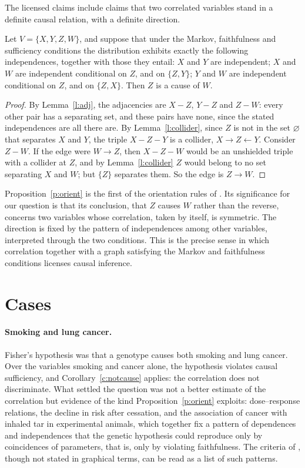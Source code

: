 \documentclass{situationist-preprint}
\begin{document}
The licensed claims include claims that two correlated variables stand in a definite causal relation, with a definite direction.

\begin{proposition}[Orientation]\label{p:orient}
Let $V = \{X, Y, Z, W\}$, and suppose that under the Markov, faithfulness and sufficiency conditions the distribution exhibits exactly the following independences, together with those they entail: $X$ and $Y$ are independent; $X$ and $W$ are independent conditional on $Z$, and on $\{Z, Y\}$; $Y$ and $W$ are independent conditional on $Z$, and on $\{Z, X\}$. Then $Z$ is a cause of $W$.
\end{proposition}

\begin{proof}
By Lemma~\ref{l:adj}, the adjacencies are $X - Z$, $Y - Z$ and $Z - W$: every other pair has a separating set, and these pairs have none, since the stated independences are all there are. By Lemma~\ref{l:collider}, since $Z$ is not in the set $\varnothing$ that separates $X$ and $Y$, the triple $X - Z - Y$ is a collider, $X \to Z \leftarrow Y$. Consider $Z - W$. If the edge were $W \to Z$, then $X - Z - W$ would be an unshielded triple with a collider at $Z$, and by Lemma~\ref{l:collider} $Z$ would belong to no set separating $X$ and $W$; but $\{Z\}$ separates them. So the edge is $Z \to W$.
\end{proof}

Proposition~\ref{p:orient} is the first of the orientation rules of \citet{Meek1995b}. Its significance for our question is that its conclusion, that $Z$ causes $W$ rather than the reverse, concerns two variables whose correlation, taken by itself, is symmetric. The direction is fixed by the pattern of independences among other variables, interpreted through the two conditions. This is the precise sense in which correlation together with a graph satisfying the Markov and faithfulness conditions licenses causal inference.

\section{Cases}\label{s:cases}

\paragraph{Smoking and lung cancer.} Fisher's hypothesis was that a genotype causes both smoking and lung cancer. Over the variables smoking and cancer alone, the hypothesis violates causal sufficiency, and Corollary~\ref{c:notcause} applies: the correlation does not discriminate. What settled the question was not a better estimate of the correlation but evidence of the kind Proposition~\ref{p:orient} exploits: dose--response relations, the decline in risk after cessation, and the association of cancer with inhaled tar in experimental animals, which together fix a pattern of dependences and independences that the genetic hypothesis could reproduce only by coincidences of parameters, that is, only by violating faithfulness. The criteria of \citet{Hill1965}, though not stated in graphical terms, can be read as a list of such patterns.
\end{document}
